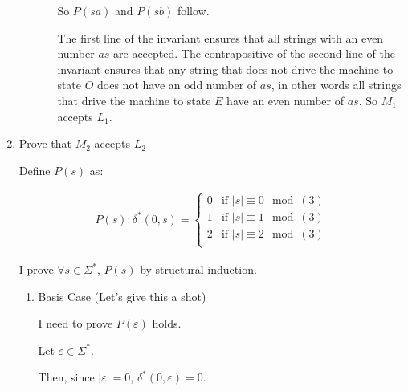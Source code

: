 \documentclass[12pt]{article}
\begin{document}
\begin{enumerate}[1.]
\begin{mdframed}
\begin{enumerate}[1.]
\begin{enumerate}[1.]
\begin{mdframed}
            \end{mdframed}

            \bigskip

            So $P(sa)$ and $P(sb)$ follow.

            \bigskip

            The first line of the invariant ensures that all strings with an even number
            $as$ are accepted. The contrapositive of the second line of the invariant
            ensures that any string that does not drive the machine to state $O$ does
            not have an odd number of $as$, in other words all strings that drive
            the machine to state $E$ have an even number of $as$. So $M_1$ accepts $L_1$.

        \end{enumerate}
    \end{enumerate}
    \end{mdframed}

    \item Prove that $M_2$ accepts $L_2$

    \bigskip

    Define $P(s)$ as:

    \begin{align}
        P(s): \delta^*(0,s) = \begin{cases}
            0 & \text{if $\vert s \vert \equiv 0 \mod (3)$}\\
            1 & \text{if $\vert s \vert \equiv 1 \mod (3)$}\\
            2 & \text{if $\vert s \vert \equiv 2 \mod (3)$}\\
        \end{cases}
    \end{align}

    I prove $\forall s \in \Sigma^*$, $P(s)$ by structural induction.

    \bigskip

    \begin{enumerate}[1.]
        \item Basis Case (Let's give this a shot)

        \begin{mdframed}
        I need to prove $P(\varepsilon)$ holds.

        \bigskip

        Let $\varepsilon \in \Sigma^*$.

        \bigskip

        Then, since $\vert \varepsilon \vert = 0$, $\delta^*(0,\varepsilon) = 0$.


\end{mdframed}
\end{enumerate}
\end{enumerate}
\end{document}
